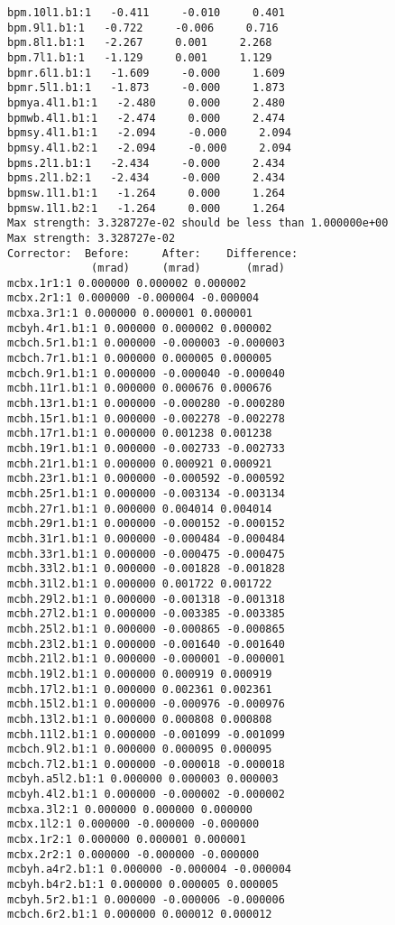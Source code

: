 \begin{verbatim}
bpm.10l1.b1:1   -0.411     -0.010     0.401
bpm.9l1.b1:1   -0.722     -0.006     0.716
bpm.8l1.b1:1   -2.267     0.001     2.268
bpm.7l1.b1:1   -1.129     0.001     1.129
bpmr.6l1.b1:1   -1.609     -0.000     1.609
bpmr.5l1.b1:1   -1.873     -0.000     1.873
bpmya.4l1.b1:1   -2.480     0.000     2.480
bpmwb.4l1.b1:1   -2.474     0.000     2.474
bpmsy.4l1.b1:1   -2.094     -0.000     2.094
bpmsy.4l1.b2:1   -2.094     -0.000     2.094
bpms.2l1.b1:1   -2.434     -0.000     2.434
bpms.2l1.b2:1   -2.434     -0.000     2.434
bpmsw.1l1.b1:1   -1.264     0.000     1.264
bpmsw.1l1.b2:1   -1.264     0.000     1.264
Max strength: 3.328727e-02 should be less than 1.000000e+00
Max strength: 3.328727e-02
Corrector:  Before:     After:    Difference:
             (mrad)     (mrad)       (mrad)  
mcbx.1r1:1 0.000000 0.000002 0.000002
mcbx.2r1:1 0.000000 -0.000004 -0.000004
mcbxa.3r1:1 0.000000 0.000001 0.000001
mcbyh.4r1.b1:1 0.000000 0.000002 0.000002
mcbch.5r1.b1:1 0.000000 -0.000003 -0.000003
mcbch.7r1.b1:1 0.000000 0.000005 0.000005
mcbch.9r1.b1:1 0.000000 -0.000040 -0.000040
mcbh.11r1.b1:1 0.000000 0.000676 0.000676
mcbh.13r1.b1:1 0.000000 -0.000280 -0.000280
mcbh.15r1.b1:1 0.000000 -0.002278 -0.002278
mcbh.17r1.b1:1 0.000000 0.001238 0.001238
mcbh.19r1.b1:1 0.000000 -0.002733 -0.002733
mcbh.21r1.b1:1 0.000000 0.000921 0.000921
mcbh.23r1.b1:1 0.000000 -0.000592 -0.000592
mcbh.25r1.b1:1 0.000000 -0.003134 -0.003134
mcbh.27r1.b1:1 0.000000 0.004014 0.004014
mcbh.29r1.b1:1 0.000000 -0.000152 -0.000152
mcbh.31r1.b1:1 0.000000 -0.000484 -0.000484
mcbh.33r1.b1:1 0.000000 -0.000475 -0.000475
mcbh.33l2.b1:1 0.000000 -0.001828 -0.001828
mcbh.31l2.b1:1 0.000000 0.001722 0.001722
mcbh.29l2.b1:1 0.000000 -0.001318 -0.001318
mcbh.27l2.b1:1 0.000000 -0.003385 -0.003385
mcbh.25l2.b1:1 0.000000 -0.000865 -0.000865
mcbh.23l2.b1:1 0.000000 -0.001640 -0.001640
mcbh.21l2.b1:1 0.000000 -0.000001 -0.000001
mcbh.19l2.b1:1 0.000000 0.000919 0.000919
mcbh.17l2.b1:1 0.000000 0.002361 0.002361
mcbh.15l2.b1:1 0.000000 -0.000976 -0.000976
mcbh.13l2.b1:1 0.000000 0.000808 0.000808
mcbh.11l2.b1:1 0.000000 -0.001099 -0.001099
mcbch.9l2.b1:1 0.000000 0.000095 0.000095
mcbch.7l2.b1:1 0.000000 -0.000018 -0.000018
mcbyh.a5l2.b1:1 0.000000 0.000003 0.000003
mcbyh.4l2.b1:1 0.000000 -0.000002 -0.000002
mcbxa.3l2:1 0.000000 0.000000 0.000000
mcbx.1l2:1 0.000000 -0.000000 -0.000000
mcbx.1r2:1 0.000000 0.000001 0.000001
mcbx.2r2:1 0.000000 -0.000000 -0.000000
mcbyh.a4r2.b1:1 0.000000 -0.000004 -0.000004
mcbyh.b4r2.b1:1 0.000000 0.000005 0.000005
mcbyh.5r2.b1:1 0.000000 -0.000006 -0.000006
mcbch.6r2.b1:1 0.000000 0.000012 0.000012

\end{verbatim}
